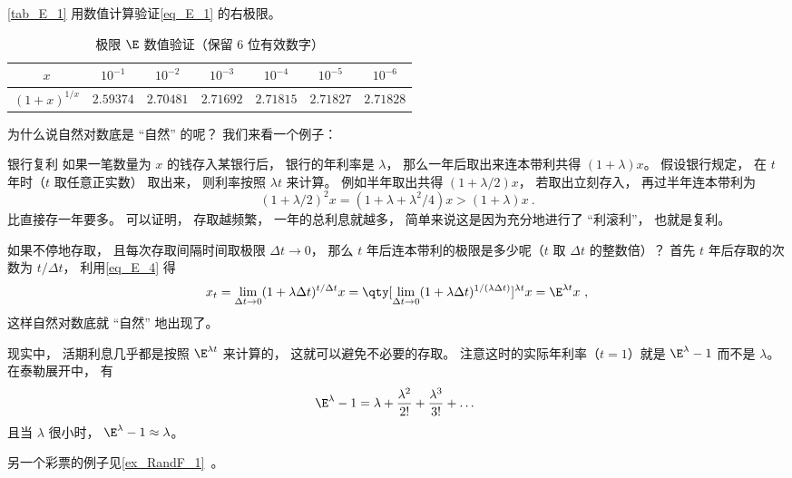 \autoref{tab_E_1} 用数值计算验证\autoref{eq_E_1} 的右极限。
\begin{table}[ht]
\centering
\caption{极限 $\E$ 数值验证（保留 6 位有效数字）}\label{tab_E_1}
\begin{tabular}{|c|c|c|c|c|c|c|}
\hline
$x$ & $10^{-1}$ & $10^{-2}$ & $10^{-3}$ & $10^{-4}$ & $10^{-5}$ & $10^{-6}$ \\
\hline
$(1 + x)^{1/x}$ & $2.59374$ & $2.70481$ & $2.71692$ & $2.71815$ & $2.71827$ & $2.71828$ \\
\hline
\end{tabular}
\end{table}

为什么说自然对数底是 “自然” 的呢？ 我们来看一个例子：

\begin{example}{银行复利}
如果一笔数量为 $x$ 的钱存入某银行后， 银行的年利率是 $\lambda$， 那么一年后取出来连本带利共得 $(1+\lambda)x$。 假设银行规定， 在 $t$ 年时（$t$ 取任意正实数） 取出来， 则利率按照 $\lambda t$ 来计算。 例如半年取出共得 $(1+\lambda/2)x$， 若取出立刻存入， 再过半年连本带利为
\begin{equation}
(1+\lambda/2)^2 x = (1 + \lambda + \lambda^2/4)x > (1 + \lambda) x~.
\end{equation}
比直接存一年要多。 可以证明， 存取越频繁， 一年的总利息就越多， 简单来说这是因为充分地进行了 “利滚利”， 也就是复利。

如果不停地存取， 且每次存取间隔时间取极限 $\Delta t \to 0$， 那么 $t$ 年后连本带利的极限是多少呢（$t$ 取 $\Delta t$ 的整数倍）？ 首先 $t$ 年后存取的次数为 $t/\Delta t$， 利用\autoref{eq_E_4} 得
\begin{equation}
x_t = \lim_{\Delta t\to 0}(1 + \lambda \Delta t)^{t/\Delta t} x
= \qty[\lim_{\Delta t\to 0}(1 + \lambda \Delta t)^{1/(\lambda \Delta t)}]^{\lambda t} x
= \E^{\lambda t} x~,
\end{equation}
这样自然对数底就 “自然” 地出现了。

现实中， 活期利息几乎都是按照 $\E^{\lambda t}$ 来计算的， 这就可以避免不必要的存取。 注意这时的实际年利率（$t = 1$）就是 $\E^\lambda - 1$ 而不是 $\lambda$。 在泰勒展开中， 有
\begin{equation}
\E^\lambda - 1 = \lambda + \frac{\lambda^2}{2!} + \frac{\lambda^3}{3!} + \dots~
\end{equation}
且当 $\lambda$ 很小时， $\E^\lambda - 1 \approx \lambda$。
\end{example}

另一个彩票的例子见\autoref{ex_RandF_1}~。
